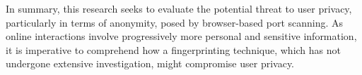 In summary, this research seeks to evaluate the potential threat to user privacy, particularly in terms of anonymity, posed by browser-based port scanning. 
As online interactions involve progressively more personal and sensitive information, it is imperative to comprehend how a fingerprinting technique, which has not undergone extensive investigation, might compromise user privacy.







